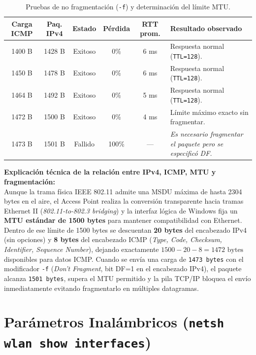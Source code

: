 \documentclass[11pt, a4paper]{article}
\begin{document}
\begin{table}[h!]
\centering
\small
\setlength{\tabcolsep}{4pt}
\caption{Pruebas de no fragmentación (\texttt{-f}) y determinación del límite MTU.}
\begin{tabularx}{\textwidth}{ccccc>{\raggedright\arraybackslash}X}
\toprule
\textbf{Carga ICMP} & \textbf{Paq. IPv4} & \textbf{Estado} & \textbf{Pérdida} & \textbf{RTT prom.} & \textbf{Resultado observado} \\
\midrule
1400 B & 1428 B & Exitoso & 0\% & 6 ms & Respuesta normal (\texttt{TTL=128}). \\
1450 B & 1478 B & Exitoso & 0\% & 6 ms & Respuesta normal (\texttt{TTL=128}). \\
1464 B & 1492 B & Exitoso & 0\% & 5 ms & Respuesta normal (\texttt{TTL=128}). \\
1472 B & 1500 B & Exitoso & 0\% & 4 ms & Límite máximo exacto sin fragmentar. \\
1473 B & 1501 B & Fallido & 100\% & --- & \textit{Es necesario fragmentar el paquete pero se especificó DF.} \\
\bottomrule
\end{tabularx}
\end{table}

\noindent \textbf{Explicación técnica de la relación entre IPv4, ICMP, MTU y fragmentación:} \\
Aunque la trama física IEEE 802.11 admite una MSDU máxima de hasta 2304 bytes en el aire, el Access Point realiza la conversión transparente hacia tramas Ethernet II (\textit{802.11-to-802.3 bridging}) y la interfaz lógica de Windows fija un \textbf{MTU estándar de 1500 bytes} para mantener compatibilidad con Ethernet. Dentro de ese límite de 1500 bytes se descuentan \textbf{20 bytes} del encabezado IPv4 (sin opciones) y \textbf{8 bytes} del encabezado ICMP (\textit{Type, Code, Checksum, Identifier, Sequence Number}), dejando exactamente $1500 - 20 - 8 = 1472\text{ bytes}$ disponibles para datos ICMP. Cuando se envía una carga de \texttt{1473 bytes} con el modificador \texttt{-f} (\textit{Don't Fragment}, bit DF=1 en el encabezado IPv4), el paquete alcanza \texttt{1501 bytes}, supera el MTU permitido y la pila TCP/IP bloquea el envío inmediatamente evitando fragmentarlo en múltiples datagramas.

\section{Parámetros Inalámbricos (\texttt{netsh wlan show interfaces})}
\end{document}
